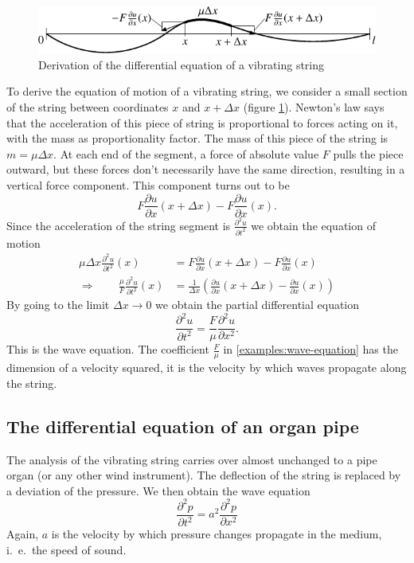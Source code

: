 \begin{figure}
\begin{center}
\includegraphics[width=\hsize]{../common/images/saite-1}
\end{center}
\caption{Derivation of the differential equation of a vibrating string
\label{saite}}
\end{figure}
To derive the equation of motion of a vibrating string, we consider
a small section of the string between coordinates $x$ and $x+\Delta x$
(figure \ref{saite}).
Newton's law says that the acceleration of this piece of string 
is proportional to forces acting on it, with the mass as proportionality
factor.
The mass of this piece of the string is $m=\mu\Delta x$.
At each end of the segment, a force of absolute value $F$ pulls the piece
outward, but these forces don't necessarily have the same direction,
resulting in a vertical force component.
This component turns out to be
\[
F\frac{\partial u}{\partial x}(x+\Delta x)-F\frac{\partial u}{\partial x}(x).
\]
Since the acceleration of the string segment is
$\displaystyle\frac{\partial^2u}{\partial t^2}$
we obtain the equation of motion
\begin{align*}
\mu\Delta x\frac{\partial^2u}{\partial t^2}(x)&=
F\frac{\partial u}{\partial x}(x+\Delta x)-F\frac{\partial u}{\partial x}(x)\\
\Rightarrow\qquad
\frac{\mu}{F}\frac{\partial^2u}{\partial t^2}(x)&=
\frac1{\Delta x}\left(\frac{\partial u}{\partial x}(x+\Delta x)-\frac{\partial u}{\partial x}(x)\right)
\end{align*}
By going to the limit 
$\Delta x\to 0$ we obtain the partial differential equation
\begin{equation}
\frac{\partial^2u}{\partial t^2}=\frac{F}{\mu}\frac{\partial^2u}{\partial x^2}.
\label{examples:wave-equation}
\end{equation}
This is the wave equation.
The coefficient
$\frac{F}{\mu}$
in \eqref{examples:wave-equation}
has the dimension of a velocity squared, it is the velocity by which waves
propagate along the string.

\subsection{The differential equation of an organ pipe}
The analysis of the vibrating string carries over almost unchanged
to a pipe organ (or any other wind instrument).
The deflection of the string is replaced by a deviation of the pressure.
We then obtain the wave equation
\[
\frac{\partial^2p}{\partial t^2}=
a^2\frac{\partial^2p}{\partial x^2}
\]
Again, $a$ is the velocity by which pressure changes propagate in
the medium, i.~e.~the speed of sound.

